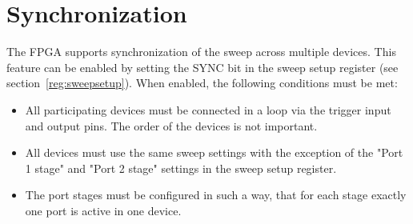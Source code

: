 \documentclass{article}
\newcommand{\bitrect}[2]{
  \begin{pgfonlayer}{foreground}
    \draw [thick] (0,0) rectangle (#1,1);
    \pgfmathsetmacro\result{#1-1}
    \foreach \x in {1,...,\result}
      \draw [thick] (\x,1) -- (\x, 0.8);
  \end{pgfonlayer}
  \bitlabels{#1}{#2}
}
\newcommand{\rwbits}[3]{
  \draw [thick] (#1,0) rectangle ++(#2,1) node[pos=0.5]{#3};
  \pgfmathsetmacro\start{#1+0.5}
  \pgfmathsetmacro\finish{#1+#2-0.5}
}
\newcommand{\bitlabels}[2]{
  \foreach \bit in {1,...,#1}{
     \pgfmathsetmacro\result{#2}
     \node [above] at (\bit-0.5, 1) {\pgfmathprintnumber{\result}};
   }
}
\begin{document}
\begin{center}

\end{center}

\section{Synchronization}
\label{synchronization}
The FPGA supports synchronization of the sweep across multiple devices. This feature can be enabled by setting the SYNC bit in the sweep setup register (see section~\ref{reg:sweepsetup}). When enabled, the following conditions must be met:
\begin{itemize}
\item All participating devices must be connected in a loop via the trigger input and output pins. The order of the devices is not important.
\item All devices must use the same sweep settings with the exception of the "Port 1 stage" and "Port 2 stage" settings in the sweep setup register.
\item The port stages must be configured in such a way, that for each stage exactly one port is active in one device.
\end{itemize}
\end{document}
